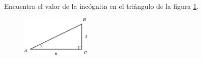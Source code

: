 Encuentra el valor de la incógnita en el triángulo de la figura \ref{fig:angle_functrig_28}.
\begin{figure}[H]
    \begin{center}
        \includegraphics[width=0.3\textwidth]{../images/angle_functrig_28.png}
    \end{center}
    \caption{}
    \label{fig:angle_functrig_28}
\end{figure}
